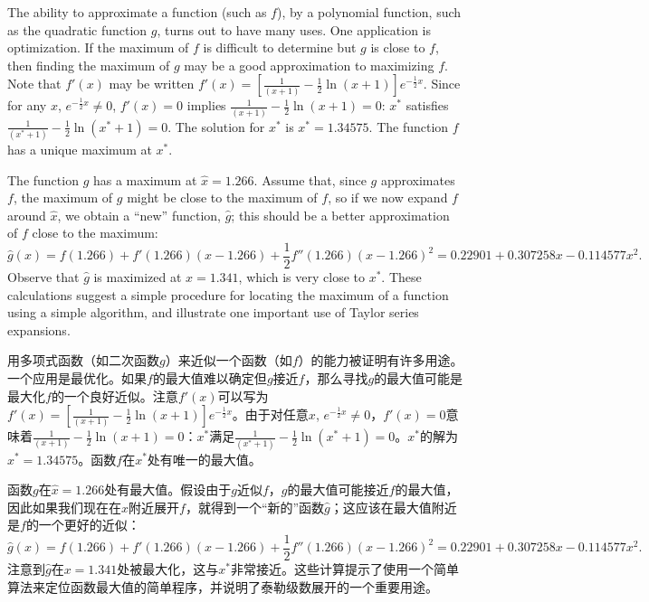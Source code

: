 \begin{original}
The ability to approximate a function (such as $f$), by a polynomial function, such as the quadratic function $g$, turns out to have many uses. One application is optimization. If the maximum of $f$ is difficult to determine but $g$ is close to $f$, then finding the maximum of $g$ may be a good approximation to maximizing $f$. Note that $f'(x)$ may be written $f'(x) = \left[\frac{1}{(x+1)} - \frac{1}{2}\ln(x+1)\right]e^{-\frac{1}{2}x}$. Since for any $x$, $e^{-\frac{1}{2}x} \ne 0$, $f'(x) = 0$ implies $\frac{1}{(x+1)} - \frac{1}{2}\ln(x+1) = 0$: $x^*$ satisfies $\frac{1}{(x^*+1)} - \frac{1}{2}\ln(x^*+1) = 0$. The solution for $x^*$ is $x^* = 1.34575$. The function $f$ has a unique maximum at $x^*$.

The function $g$ has a maximum at $\hat{x} = 1.266$. Assume that, since $g$ approximates $f$, the maximum of $g$ might be close to the maximum of $f$, so if we now expand $f$ around $\hat{x}$, we obtain a ``new'' function, $\hat{g}$; this should be a better approximation of $f$ close to the maximum:
\[
\hat{g}(x) = f(1.266) + f'(1.266)(x - 1.266) + \frac{1}{2}f''(1.266)(x - 1.266)^2 = 0.22901 + 0.307258x - 0.114577x^2.
\]
Observe that $\hat{g}$ is maximized at $x = 1.341$, which is very close to $x^*$. These calculations suggest a simple procedure for locating the maximum of a function using a simple algorithm, and illustrate one important use of Taylor series expansions.
\end{original}
\begin{translation}
用多项式函数（如二次函数$g$）来近似一个函数（如$f$）的能力被证明有许多用途。一个应用是最优化。如果$f$的最大值难以确定但$g$接近$f$，那么寻找$g$的最大值可能是最大化$f$的一个良好近似。注意$f'(x)$可以写为$f'(x) = \left[\frac{1}{(x+1)} - \frac{1}{2}\ln(x+1)\right]e^{-\frac{1}{2}x}$。由于对任意$x$, $e^{-\frac{1}{2}x} \ne 0$，$f'(x) = 0$意味着$\frac{1}{(x+1)} - \frac{1}{2}\ln(x+1) = 0$：$x^*$满足$\frac{1}{(x^*+1)} - \frac{1}{2}\ln(x^*+1) = 0$。$x^*$的解为$x^* = 1.34575$。函数$f$在$x^*$处有唯一的最大值。

函数$g$在$\hat{x} = 1.266$处有最大值。假设由于$g$近似$f$，$g$的最大值可能接近$f$的最大值，因此如果我们现在在$\hat{x}$附近展开$f$，就得到一个``新的''函数$\hat{g}$；这应该在最大值附近是$f$的一个更好的近似：
\[
\hat{g}(x) = f(1.266) + f'(1.266)(x - 1.266) + \frac{1}{2}f''(1.266)(x - 1.266)^2 = 0.22901 + 0.307258x - 0.114577x^2.
\]
注意到$\hat{g}$在$x = 1.341$处被最大化，这与$x^*$非常接近。这些计算提示了使用一个简单算法来定位函数最大值的简单程序，并说明了泰勒级数展开的一个重要用途。
\end{translation}


